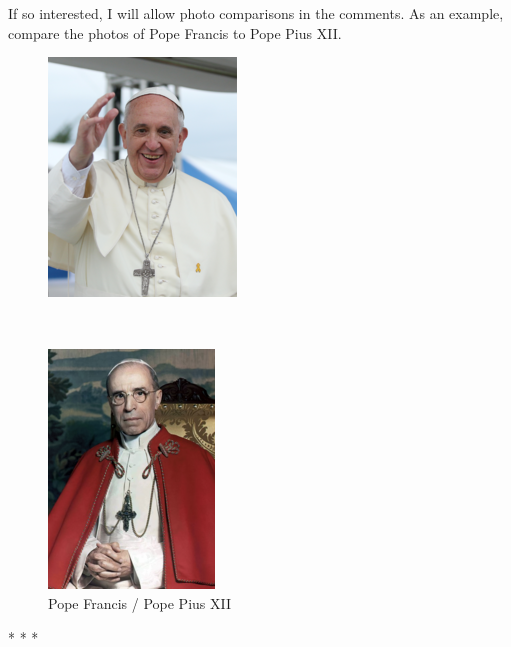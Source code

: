 \hfill

If so interested, I will allow photo comparisons in the comments. As an example, compare the photos of Pope Francis to Pope Pius XII.

\begin{figure}[ht]
\centering
\begin{minipage}{.45\textwidth}
\includegraphics[scale=.5]{a20160315ShipofState-img001.png}
\end{minipage}~%
\begin{minipage}{.45\textwidth}
\includegraphics[scale=.5]{a20160315ShipofState-img002.png}
\end{minipage}
\caption{Pope Francis / Pope Pius XII}
\end{figure}

\hfill




\begin{center}* * *\end{center}


